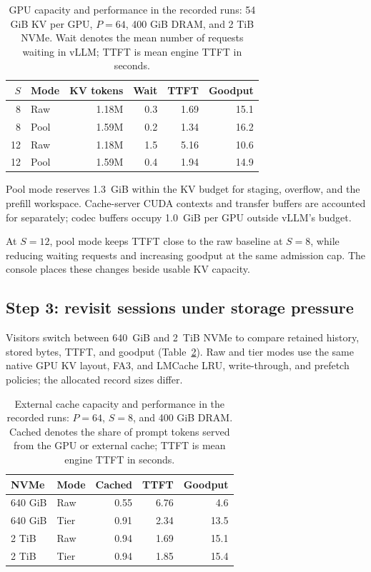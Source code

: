 \documentclass[conference]{IEEEtran}
\begin{document}
\begin{table}[t]
\centering
\caption{GPU capacity and performance in the recorded runs: 54 GiB KV per
GPU, $P=64$, 400 GiB DRAM, and 2 TiB NVMe. Wait denotes the mean number of
requests waiting in vLLM; TTFT is mean engine TTFT in seconds.}
\label{tab:gpu}
\small
\setlength{\tabcolsep}{3pt}
\begin{tabular*}{\columnwidth}{@{\extracolsep{\fill}}rlrrrr@{}}
\toprule
$S$ & Mode & KV tokens & Wait & TTFT & Goodput \\
\midrule
8  & Raw  & 1.18M & 0.3 & 1.69 & 15.1 \\
8  & Pool & 1.59M & 0.2 & 1.34 & 16.2 \\
12 & Raw  & 1.18M & 1.5 & 5.16 & 10.6 \\
12 & Pool & 1.59M & 0.4 & 1.94 & 14.9 \\
\bottomrule
\end{tabular*}
\end{table}

Pool mode reserves 1.3~GiB within the KV budget for staging, overflow, and
the prefill workspace. Cache-server CUDA contexts and transfer buffers are
accounted for separately; codec buffers occupy 1.0~GiB per GPU outside
vLLM's budget.

At $S=12$, pool mode keeps TTFT close to the raw baseline at $S=8$,
while reducing waiting requests and increasing goodput at the same
admission cap. The console places these changes beside usable KV capacity.

\subsection{Step 3: revisit sessions under storage pressure}
Visitors switch between 640~GiB and 2~TiB NVMe to compare retained
history, stored bytes, TTFT, and goodput (Table~\ref{tab:tiers}). Raw and tier
modes use the same native GPU KV layout, FA3, and LMCache LRU, write-through,
and prefetch policies; the allocated record sizes differ.

\begin{table}[t]
\centering
\caption{External cache capacity and performance in the recorded runs:
$P=64$, $S=8$, and 400 GiB DRAM. Cached denotes the share of prompt tokens
served from the GPU or external cache; TTFT is mean engine TTFT in seconds.}
\label{tab:tiers}
\small
\setlength{\tabcolsep}{3pt}
\begin{tabular*}{\columnwidth}{@{\extracolsep{\fill}}llrrr@{}}
\toprule
NVMe & Mode & Cached & TTFT & Goodput \\
\midrule
640 GiB & Raw  & 0.55 & 6.76 & 4.6 \\
640 GiB & Tier & 0.91 & 2.34 & 13.5 \\
2 TiB   & Raw  & 0.94 & 1.69 & 15.1 \\
2 TiB   & Tier & 0.94 & 1.85 & 15.4 \\
\bottomrule
\end{tabular*}
\end{table}
\end{document}
